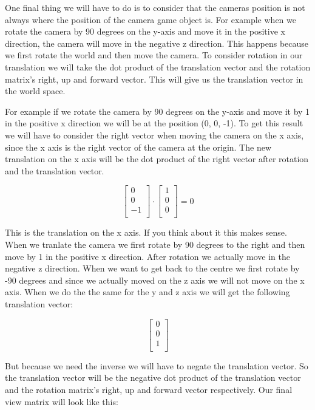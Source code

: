 \documentclass[12pt]{report} \usepackage{preamble}
\begin{document}
One final thing we will have to do is to consider that the cameras position is not always where the position of the camera game object is.
For example when we rotate the camera by 90 degrees on the y-axis and move it in the positive x direction, the camera will move in the negative z direction.
This happens because we first rotate the world and then move the camera. To consider rotation in our translation we will take the dot product of the translation vector and the rotation matrix's
right, up and forward vector. This will give us the translation vector in the world space.

For example if we rotate the camera by 90 degrees on the y-axis and move it by 1 in the positive x direction we will be at the position (0, 0, -1).
To get this result we will have to consider the right vector when moving the camera on the x axis, since the x axis is the right vector of the camera at the origin.
The new translation on the x axis will be the dot product of the right vector after rotation and the translation vector.

\[
	\begin{bmatrix}
		0  \\
		0  \\
		-1 \\
	\end{bmatrix}
	\cdot
	\begin{bmatrix}
		1 \\
		0 \\
		0 \\
	\end{bmatrix}
	=
	0
\]

This is the translation on the x axis. If you think about it this makes sense.
When we tranlate the camera we first rotate by 90 degrees to the right and then move by 1 in the positive x direction.
After rotation we actually move in the negative z direction. When we want to get back to the centre we first rotate by -90 degrees and since we
actually moved on the z axis we will not move on the x axis. When we do the the same for the y and z axis we will get the following translation vector:

\[
	\begin{bmatrix}
		0 \\
		0 \\
		1 \\
	\end{bmatrix}
\]

But because we need the inverse we will have to negate the translation vector.
So the translation vector will be the negative dot product of the translation vector and the rotation matrix's right, up and forward vector respectively.
Our final view matrix will look like this:
\end{document}
